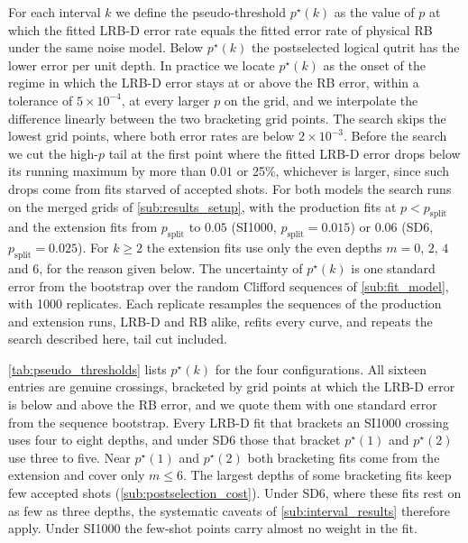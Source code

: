 For each interval $k$ we define the pseudo-threshold $p^\star(k)$ as the value of $p$ at which the fitted LRB-D error rate equals the fitted error rate of physical RB under the same noise model. Below $p^\star(k)$ the postselected logical qutrit has the lower error per unit depth. In practice we locate $p^\star(k)$ as the onset of the regime in which the LRB-D error stays at or above the RB error, within a tolerance of $5\times10^{-4}$, at every larger $p$ on the grid, and we interpolate the difference linearly between the two bracketing grid points. The search skips the lowest grid points, where both error rates are below $2\times10^{-3}$. Before the search we cut the high-$p$ tail at the first point where the fitted LRB-D error drops below its running maximum by more than $0.01$ or 25\%, whichever is larger, since such drops come from fits starved of accepted shots. For both models the search runs on the merged grids of \autoref{sub:results_setup}, with the production fits at $p < p_{\mathrm{split}}$ and the extension fits from $p_{\mathrm{split}}$ to $0.05$ (SI1000, $p_{\mathrm{split}} = 0.015$) or $0.06$ (SD6, $p_{\mathrm{split}} = 0.025$). For $k \ge 2$ the extension fits use only the even depths $m = 0$, $2$, $4$ and $6$, for the reason given below. The uncertainty of $p^\star(k)$ is one standard error from the bootstrap over the random Clifford sequences of \autoref{sub:fit_model}, with 1000 replicates. Each replicate resamples the sequences of the production and extension runs, LRB-D and RB alike, refits every curve, and repeats the search described here, tail cut included.

\autoref{tab:pseudo_thresholds} lists $p^\star(k)$ for the four configurations. All sixteen entries are genuine crossings, bracketed by grid points at which the LRB-D error is below and above the RB error, and we quote them with one standard error from the sequence bootstrap. Every LRB-D fit that brackets an SI1000 crossing uses four to eight depths, and under SD6 those that bracket $p^\star(1)$ and $p^\star(2)$ use three to five. Near $p^\star(1)$ and $p^\star(2)$ both bracketing fits come from the extension and cover only $m \le 6$. The largest depths of some bracketing fits keep few accepted shots (\autoref{sub:postselection_cost}). Under SD6, where these fits rest on as few as three depths, the systematic caveats of \autoref{sub:interval_results} therefore apply. Under SI1000 the few-shot points carry almost no weight in the fit.

